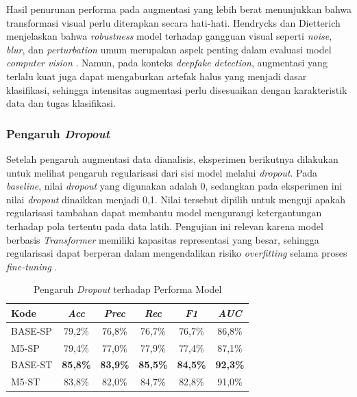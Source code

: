 Hasil penurunan performa pada augmentasi yang lebih berat menunjukkan bahwa transformasi visual perlu diterapkan secara hati-hati. Hendrycks dan Dietterich menjelaskan bahwa \textit{robustness} model terhadap gangguan visual seperti \textit{noise}, \textit{blur}, dan \textit{perturbation} umum merupakan aspek penting dalam evaluasi model \textit{computer vision} \cite{hendrycks2019benchmarkingneuralnetworkrobustness}. Namun, pada konteks \textit{deepfake detection}, augmentasi yang terlalu kuat juga dapat mengaburkan artefak halus yang menjadi dasar klasifikasi, sehingga intensitas augmentasi perlu disesuaikan dengan karakteristik data dan tugas klasifikasi.

\subsubsection{Pengaruh \textit{Dropout}} \label{IV.Eksperimen_Ablation_Dropout}
Setelah pengaruh augmentasi data dianalisis, eksperimen berikutnya dilakukan untuk melihat pengaruh regularisasi dari sisi model melalui \textit{dropout}. Pada \textit{baseline}, nilai \textit{dropout} yang digunakan adalah 0, sedangkan pada eksperimen ini nilai \textit{dropout} dinaikkan menjadi 0,1. Nilai tersebut dipilih untuk menguji apakah regularisasi tambahan dapat membantu model mengurangi ketergantungan terhadap pola tertentu pada data latih. Pengujian ini relevan karena model berbasis \textit{Transformer} memiliki kapasitas representasi yang besar, sehingga regularisasi dapat berperan dalam mengendalikan risiko \textit{overfitting} selama proses \textit{fine-tuning} \cite{JMLR:v15:srivastava14a}.

\begin{table}[htbp]
\centering
\caption{Pengaruh \textit{Dropout} terhadap Performa Model}
\label{table:4.ablation-dropout}
\begin{tabular}{lccccc}
\toprule
\textbf{Kode} &
\textbf{\textit{Acc}} &
\textbf{\textit{Prec}} &
\textbf{\textit{Rec}} &
\textbf{\textit{F1}} &
\textbf{\textit{AUC}} \\
\midrule
BASE-SP & 79,2\% & 76,8\% & 76,7\% & 76,7\% & 86,8\% \\
M5-SP & 79,4\% & 77,0\% & 77,9\% & 77,4\% & 87,1\% \\
BASE-ST & \textbf{85,8\%} & \textbf{83,9\%} & \textbf{85,5\%} & \textbf{84,5\%} & \textbf{92,3\%} \\
M5-ST & 83,8\% & 82,0\% & 84,7\% & 82,8\% & 91,0\% \\
\bottomrule
\end{tabular}
\end{table}


